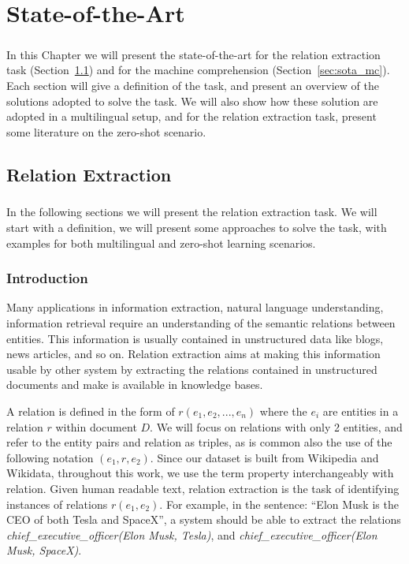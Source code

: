 \chapter{State-of-the-Art} %
\label{chpt:3}
\paragraph{}
In this Chapter we will present the state-of-the-art for the relation extraction task (Section~\ref{sec:sota_re}) and for the machine comprehension (Section~\ref{sec:sota_mc}). Each section will give a definition of the task, and present an overview of the solutions adopted to solve the task. We will also show how these solution are adopted in a multilingual setup, and for the relation extraction task, present some literature on the zero-shot scenario.   


\section{Relation Extraction}
\label{sec:sota_re}
\paragraph{}
In the following sections we will present the relation extraction task. We will start with a definition, we will present some approaches to solve the task, with examples for both multilingual and zero-shot learning scenarios.

\subsection{Introduction}
Many applications in information extraction, natural language understanding, information retrieval require an understanding of the semantic relations between entities. This information is usually contained in unstructured data like blogs, news articles, and so on.  Relation extraction aims at making this information usable by other system by extracting the relations contained in unstructured documents and make is available in knowledge bases.

A relation is defined in the form of $r(e_1, e_2, ..., e_n)$ where the $e_i$ are entities in a relation $r$ within document $D$. We will focus on relations with only 2 entities, and refer to the entity pairs and relation as triples, as is common also the use of the following notation $(e_1, r, e_2)$. Since our dataset is built from Wikipedia and Wikidata, throughout this work, we use the term property interchangeably with relation. Given human readable text, relation extraction is the task of identifying instances of relations $r(e_1,e_2)$. For example, in the sentence: ``Elon Musk is the CEO of both Tesla and SpaceX'', a system should be able to extract the relations \textit{chief\_executive\_officer({Elon Musk}, Tesla)}, and \textit{chief\_executive\_officer(Elon Musk, SpaceX)}. 

